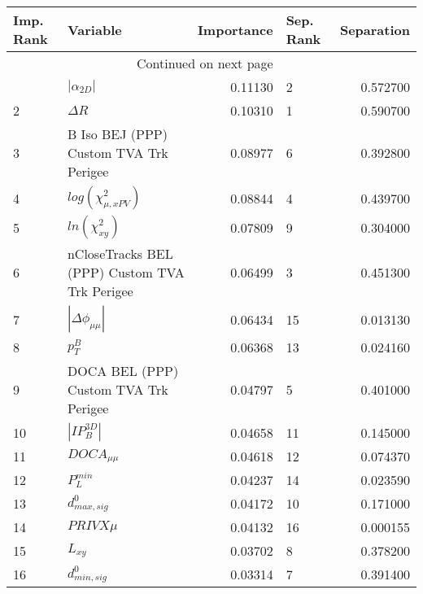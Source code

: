 \usepackage{lscape}

\begin{landscape}
\begin{longtable}{llrlr}
\toprule
Imp. Rank &                                       Variable &  Importance & Sep. Rank &  Separation \\
\midrule
\endhead
\midrule
\multicolumn{3}{r}{{Continued on next page}} \\
\midrule
\endfoot

\bottomrule
\endlastfoot
        1 &                                $|\alpha_{2D}|$ &     0.11130 &         2 &    0.572700 \\
        2 &                                     $\Delta R$ &     0.10310 &         1 &    0.590700 \\
        3 &         B Iso BEJ (PPP) Custom TVA Trk Perigee &     0.08977 &         6 &    0.392800 \\
        4 &                      $log(\chi^{2}_{\mu,xPV})$ &     0.08844 &         4 &    0.439700 \\
        5 &                            $ln(\chi^{2}_{xy})$ &     0.07809 &         9 &    0.304000 \\
        6 &  nCloseTracks BEL (PPP) Custom TVA Trk Perigee &     0.06499 &         3 &    0.451300 \\
        7 &                       $|\Delta \phi_{\mu\mu}|$ &     0.06434 &        15 &    0.013130 \\
        8 &                                      $p^B_{T}$ &     0.06368 &        13 &    0.024160 \\
        9 &          DOCA BEL (PPP) Custom TVA Trk Perigee &     0.04797 &         5 &    0.401000 \\
       10 &                                $|IP_{B}^{3D}|$ &     0.04658 &        11 &    0.145000 \\
       11 &                                $DOCA_{\mu\mu}$ &     0.04618 &        12 &    0.074370 \\
       12 &                                  $P^{min}_{L}$ &     0.04237 &        14 &    0.023590 \\
       13 &                               $d^0_{max, sig}$ &     0.04172 &        10 &    0.171000 \\
       14 &                                     $PRIVX\mu$ &     0.04132 &        16 &    0.000155 \\
       15 &                                       $L_{xy}$ &     0.03702 &         8 &    0.378200 \\
       16 &                               $d^0_{min, sig}$ &     0.03314 &         7 &    0.391400 \\
\end{longtable}

\end{landscape}
